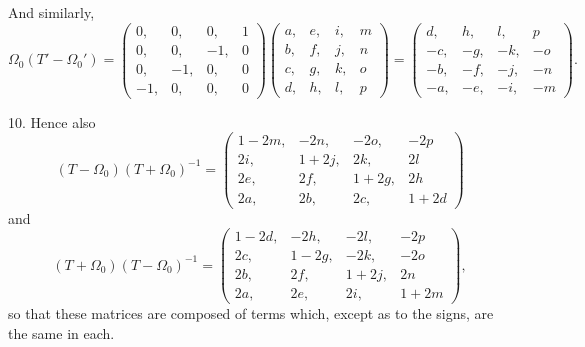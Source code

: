 \documentclass[11pt,a4paper]{article}
\theoremstyle{plain}
\begin{document}
And similarly,
\[
\Omega_0(T' - \Omega_0') =
\begin{pmatrix}
0, & 0, & 0, & 1 \\
0, & 0, & -1, & 0 \\
0, & -1, & 0, & 0 \\
-1, & 0, & 0, & 0
\end{pmatrix}
\begin{pmatrix}
a, & e, & i, & m \\
b, & f, & j, & n \\
c, & g, & k, & o \\
d, & h, & l, & p
\end{pmatrix}
=
\begin{pmatrix}
d, & h, & l, & p \\
-c, & -g, & -k, & -o \\
-b, & -f, & -j, & -n \\
-a, & -e, & -i, & -m
\end{pmatrix}.
\]

10. Hence also
\[
(T - \Omega_0)(T + \Omega_0)^{-1} =
\begin{pmatrix}
1-2m, & -2n, & -2o, & -2p \\
2i, & 1+2j, & 2k, & 2l \\
2e, & 2f, & 1+2g, & 2h \\
2a, & 2b, & 2c, & 1+2d
\end{pmatrix}
\]
and
\[
(T + \Omega_0)(T - \Omega_0)^{-1} =
\begin{pmatrix}
1-2d, & -2h, & -2l, & -2p \\
2c, & 1-2g, & -2k, & -2o \\
2b, & 2f, & 1+2j, & 2n \\
2a, & 2e, & 2i, & 1+2m
\end{pmatrix},
\]
so that these matrices are composed of terms which, except as to the signs, are the same in each.
\end{document}
